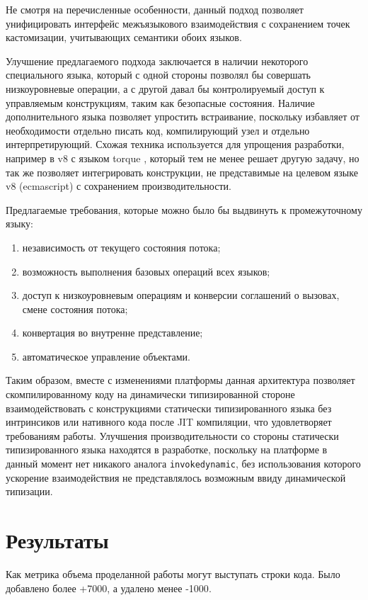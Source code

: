 \documentclass[times
]{itmo-student-thesis}
\begin{document}
\chapterconclusion
Не смотря на перечисленные особенности, данный подход позволяет унифицировать интерфейс межъязыкового взаимодействия с сохранением точек кастомизации, учитывающих семантики обоих языков.

Улучшение предлагаемого подхода заключается в наличии некоторого специального языка, который с одной стороны позволял бы совершать низкоуровневые операции, а с другой давал бы контролируемый доступ к управляемым конструкциям, таким как безопасные состояния. Наличие дополнительного языка позволяет упростить встраивание, поскольку избавляет от необходимости отдельно писать код, компилирующий узел и отдельно интерпретирующий. Схожая техника используется для упрощения разработки, например в v8 с языком torque \cite{torque}, который тем не менее решает другую задачу, но так же позволяет интегрировать конструкции, не представимые на целевом языке v8 (ecmascript) с сохранением производительности.

Предлагаемые требования, которые можно было бы выдвинуть к промежуточному языку:
\begin{enumerate}
	\item независимость от текущего состояния потока;
	\item возможность выполнения базовых операций всех языков;
	\item доступ к низкоуровневым операциям и конверсии соглашений о вызовах, смене состояния потока;
	\item конвертация во внутренне представление;
	\item автоматическое управление объектами.
\end{enumerate}
Таким образом, вместе с изменениями платформы данная архитектура позволяет скомпилированному коду на динамически типизированной стороне взаимодействовать с конструкциями статически типизированного языка без интринсиков или нативного кода после JIT компиляции, что удовлетворяет требованиям работы. Улучшения производительности со стороны статически типизированного языка находятся в разработке, поскольку на платформе в данный момент нет никакого аналога \texttt{invokedynamic}, без использования которого ускорение взаимодействия не представлялось возможным ввиду динамической типизации.

\chapter{Результаты}\label{ch:results}
Как метрика объема проделанной работы могут выступать строки кода. Было добавлено более {\color{green}+7000}, а удалено менее {\color{red}-1000}.
\end{document}
